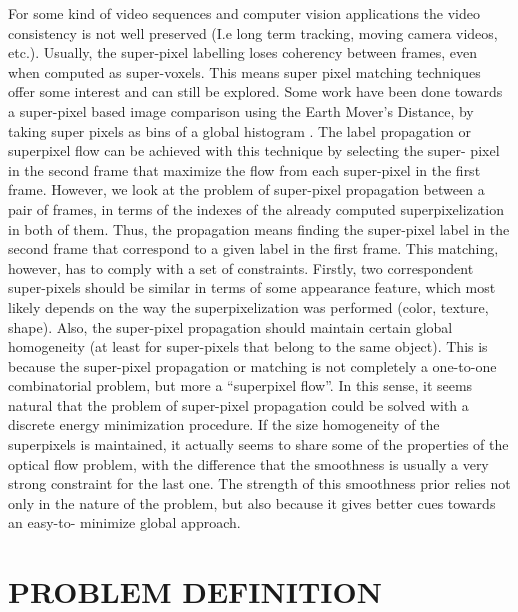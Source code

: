 \documentclass[a4paper, 10pt, conference]{ieeeconf}      %
\begin{document}
For some kind of video sequences and computer vision
applications the video consistency is not well preserved (I.e
long term tracking, moving camera videos, etc.). Usually,
the super-pixel labelling loses coherency between frames, 
even when computed as super-voxels. 
This means super pixel matching techniques offer some interest and can still be
explored. Some work have been done towards a
super-pixel based image comparison using the Earth
Mover’s Distance, by taking super pixels as bins of a
global histogram \cite{c2}. The label propagation or superpixel flow can be
achieved with this technique by selecting the super-
pixel in the second frame that maximize the flow
from each super-pixel in the first frame.
However, we look at the problem of super-pixel
propagation between a pair of frames, in terms of the
indexes of the already computed superpixelization in
both of them. Thus, the propagation means finding
the super-pixel label in the second frame that
correspond to a given label in the first frame. This
matching, however, has to comply with a set of
constraints. Firstly, two correspondent super-pixels
should be similar in terms of some appearance
feature, which most likely depends on the way the
superpixelization was performed (color, texture,
shape). Also, the super-pixel propagation should
maintain certain global homogeneity (at least for
super-pixels that belong to the same object). This is
because the super-pixel propagation or matching is
not completely a one-to-one combinatorial problem,
but more a “superpixel flow”. In this sense, it seems
natural that the problem of super-pixel propagation
could be solved with a discrete energy minimization
procedure. If the size homogeneity of the superpixels is maintained, 
it actually seems to share some of the properties of the
optical flow problem, with the difference that the
smoothness is usually a very strong constraint for the
last one. The strength of this smoothness prior relies
not only in the nature of the problem, but also
because it gives better cues towards an easy-to-
minimize global approach.


\section{PROBLEM DEFINITION}
\end{document}
